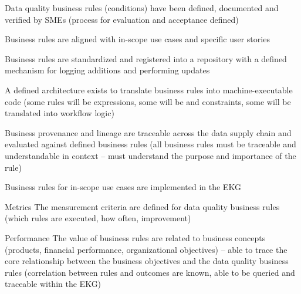 \begin{members-only}

\kgmmscoringsection

\kgmmscoringlevelOne

\begin{scoring}

  \item Data quality business rules (conditions) have been defined, documented and verified by SMEs (process for
        evaluation and acceptance defined)
  \item Business rules are aligned with in-scope use cases and specific user stories
  \item Business rules are standardized and registered into a repository with a defined mechanism for logging
        additions and performing updates

\end{scoring}

\kgmmscoringlevelTwo

\begin{scoring}

  \item A defined architecture exists to translate business rules into machine-executable code (some rules will be
         expressions, some will be  and constraints, some will be translated into
        workflow logic)
  \item Business provenance and lineage are traceable across the
        data supply chain and evaluated against defined business rules (all business rules
        must be traceable and understandable in context -- must understand the purpose and importance of the rule)
  \item Business rules for in-scope use cases are implemented in the EKG

\end{scoring}

\kgmmscoringlevelThree

\begin{scoring}

    \item [Metrics] The measurement criteria are defined for data quality business rules (which rules are executed,
          how often, improvement)
    \item [Performance] The value of business rules are related to business concepts (products, financial performance,
          organizational objectives) -- able to trace the core relationship between the business objectives and
          the data quality business rules (correlation between rules and outcomes are known, able to be queried and
          traceable within the EKG)


\end{scoring}
\end{members-only}
